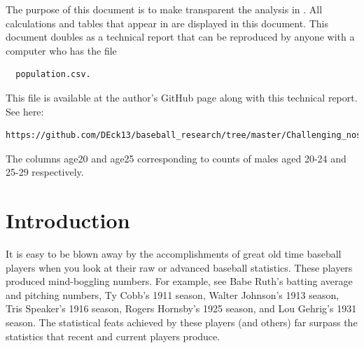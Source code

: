 \documentclass[11pt]{article}\usepackage[]{graphicx}\usepackage[]{color}
\begin{document}
The purpose of this document is to make transparent the analysis in 
\citet{eck2019challenging}.  All calculations and tables that appear in 
\citet{eck2019challenging} are displayed in this document.  
This document doubles as a technical report that can be reproduced by anyone 
with a computer who has the file
\begin{center}
\begin{verbatim}
  population.csv.
\end{verbatim}
\end{center}
This file is available at the author's GitHub page along with this technical 
report.  See here: 
\begin{center}
\begin{verbatim}
https://github.com/DEck13/baseball_research/tree/master/Challenging_nostalgia
\end{verbatim}
\end{center}
The columns age20 and age25 corresponding to counts of males aged 20-24 and 25-29 
respectively.


\section{Introduction}

It is easy to be blown away by the accomplishments of great old time 
baseball players when you look at their raw or advanced baseball statistics.  
These players produced mind-boggling numbers. For example, see 
Babe Ruth's batting average and pitching numbers, 
Ty Cobb's 1911 season, 
Walter Johnson's 1913 season, 
Tris Speaker's 1916 season, 
Rogers Hornsby's 1925 season, 
and
Lou Gehrig's 1931 season.
The statistical feats achieved by these players (and others) far surpass 
the statistics that recent and current players produce.  
\end{document}
